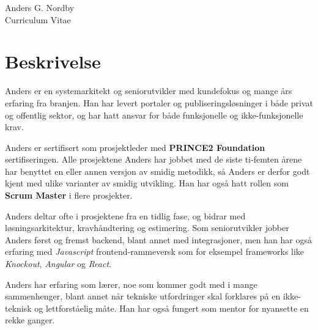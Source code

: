 \documentclass[10pt]{article} %
\begin{document}
\begin{paracol}{2} %


\parbox[top][0.12\textheight][c]{\linewidth}{ %
	\vspace{-0.04\textheight} %
	\centering %
	{\sffamily\Huge Anders G. Nordby}\\\medskip %
	{\Huge\color{headings}\cvtextfont Curriculum Vitae}
}


\section{Beskrivelse}

Anders er en systemarkitekt og seniorutvikler med kundefokus og mange års erfaring fra branjen.
Han har levert portaler og publiseringsløsninger i både privat og offentlig sektor, og har hatt
ansvar for både funksjonelle og ikke-funksjonelle krav.
\medskip

Anders er sertifisert som prosjektleder med \textbf{PRINCE2 Foundation} sertifiseringen. 
Alle prosjektene Anders har jobbet med de siste ti-femten årene har benyttet en eller annen versjon 
av smidig metodikk, så Anders er derfor godt kjent med ulike varianter av smidig utvikling.
Han har også hatt rollen som \textbf{Scrum Master} i flere prosjekter.
\medskip

Anders deltar ofte i prosjektene fra en tidlig fase, og bidrar med løsningsarkitektur, kravhåndtering og
estimering. Som seniorutvikler jobber Anders først og fremst backend, blant annet med integrasjoner,
men han har også erfaring med \textit{Javascript} frontend-rammeversk som for eksempel frameworks like \textit{Knockout}, \textit{Angular} og \textit{React}.
\medskip

Anders har erfaring som lærer, noe som kommer godt med i mange sammenhenger, blant annet når tekniske utfordringer
skal forklares på en ikke-teknisk og lettforståelig måte. Han har også fungert som mentor for nyansette en rekke ganger.
\medskip


\end{paracol}
\end{document}
